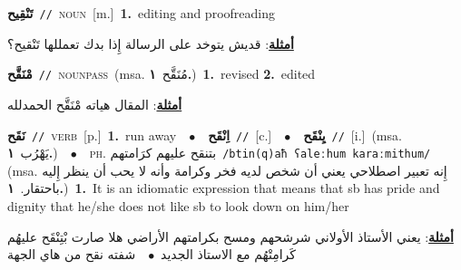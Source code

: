 \documentclass[10pt,a4paper,twoside]{article} %
\begin{document}
\begin{multicols}{2}
{\setlength\topsep{0pt}\textbf{\foreignlanguage{arabic}{تَنْقِيح}}\ {\color{gray}\texttt{//}\color{black}}\ \textsc{noun}\ [m.]\ \textbf{1.}~editing and proofreading\  \begin{flushright}\color{gray}\foreignlanguage{arabic}{\textbf{\underline{\foreignlanguage{arabic}{أمثلة}}}: قديش يتوخد على الرسالة إِذا بدك تعمللها تَنْقيح؟}\end{flushright}\color{black}} \vspace{2mm}

{\setlength\topsep{0pt}\textbf{\foreignlanguage{arabic}{مْنَقَّح}}\ {\color{gray}\texttt{//}\color{black}}\ \textsc{noun\textunderscore pass}\ \color{gray}(msa. \foreignlanguage{arabic}{مُنَقَّح}~\foreignlanguage{arabic}{\textbf{١.}})\color{black}\ \textbf{1.}~revised  \textbf{2.}~edited\  \begin{flushright}\color{gray}\foreignlanguage{arabic}{\textbf{\underline{\foreignlanguage{arabic}{أمثلة}}}: المقال هياته مْنَقَّح الحمدلله}\end{flushright}\color{black}} \vspace{2mm}

{\setlength\topsep{0pt}\textbf{\foreignlanguage{arabic}{نَقَح}}\ {\color{gray}\texttt{//}\color{black}}\ \textsc{verb}\ [p.]\ \textbf{1.}~run away\ \ $\bullet$\ \ \setlength\topsep{0pt}\textbf{\foreignlanguage{arabic}{اِنْقَح}}\ {\color{gray}\texttt{//}\color{black}}\ [c.]\ \ $\bullet$\ \ \setlength\topsep{0pt}\textbf{\foreignlanguage{arabic}{يِنْقَح}}\ {\color{gray}\texttt{//}\color{black}}\ [i.]\ \color{gray}(msa. \foreignlanguage{arabic}{يَهْرُب}~\foreignlanguage{arabic}{\textbf{١.}})\color{black}\ \ $\bullet$\ \ \textsc{ph.} \color{gray} \foreignlanguage{arabic}{بتنقح عليهم كرَامتهم}\color{black}\ {\color{gray}\texttt{/{\sffamily btin(q)aħ ʕaleːhum karaːmithum}/}\color{black}}\ \color{gray} (msa. \foreignlanguage{arabic}{إِنه تعبير اصطلاحي يعني أن شخص لديه فخر وكرامة وأنه لا يحب أن ينظر إِليه باحتقار.}~\foreignlanguage{arabic}{\textbf{١.}})\color{black}\ \textbf{1.}~It is an idiomatic expression that means that sb has pride and dignity that he/she does not like sb to look down on him/her\  \begin{flushright}\color{gray}\foreignlanguage{arabic}{\textbf{\underline{\foreignlanguage{arabic}{أمثلة}}}: يعني الأستاذ الأولاني شرشحهم ومسح بكرامتهم الأراضي هلا صارت بْتِنْقَح عليهُم كَرامِتْهُم مع الاستاذ الجديد\ $\bullet$\ \  شفته نقح من هاي الجهة}\end{flushright}\color{black}} \vspace{2mm}


\end{multicols}
\end{document}
